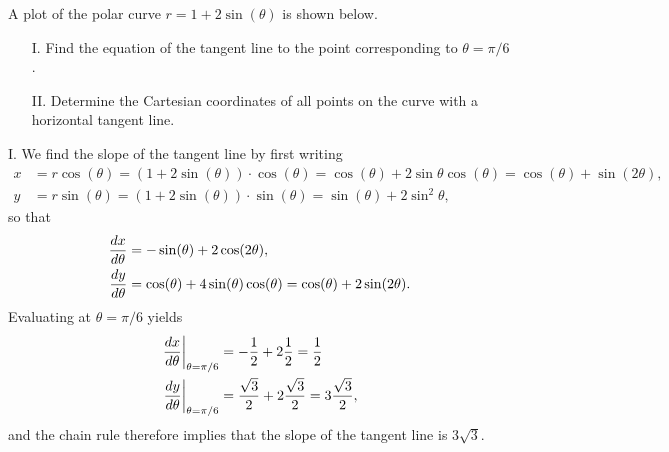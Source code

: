 \documentclass[noauthor]{ximera}
\begin{document}
\begin{problem}
A plot of the polar curve $r=1+2\sin(\theta)$ is shown below.
\begin{image}  
\end{image} 

\begin{itemize}
\item[I.] Find the equation of the tangent line to the point corresponding to $\theta = \pi/6$.
\item[II.]  Determine the Cartesian coordinates of all points on the curve with a horizontal tangent line.
\end{itemize}
\begin{freeResponse}
I. We find the slope of the tangent line by first writing
\begin{align*}
x &= r \cos(\theta) = (1+ 2 \sin(\theta)) \cdot \cos(\theta) = \cos(\theta) + 2 \sin\theta \cos(\theta) = \cos(\theta) + \sin (2\theta), \\
y&= r \sin(\theta) = (1+ 2 \sin(\theta)) \cdot \sin(\theta) = \sin(\theta) + 2 \sin^2 \theta,
\end{align*}
so that
\begin{align*}
\frac{\mathop{}\!d x}{\mathop{}\!d \theta} &= -\sin(\theta) + 2 \cos(2 \theta), \\
\frac{\mathop{}\!d y}{\mathop{}\!d \theta} &= \cos(\theta) + 4 \sin(\theta) \cos(\theta) = \cos(\theta) + 2 \sin(2 \theta).
\end{align*}
Evaluating at $\theta = \pi/6$ yields 
\begin{align*}
\left.\frac{\mathop{}\!d x}{\mathop{}\!d \theta}\right|_{\theta = \pi/6} &= -\frac{1}{2} +  2 \frac{1}{2} = \frac{1}{2} \\
\left.\frac{\mathop{}\!d y}{\mathop{}\!d \theta}\right|_{\theta = \pi/6} &= \frac{\sqrt{3}}{2} + 2 \frac{\sqrt{3}}{2} = 3 \frac{\sqrt{3}}{2},
\end{align*}
and the chain rule therefore implies that the slope of the tangent line is $3 \sqrt{3}$.


\end{freeResponse}
\end{problem}
\end{document}
